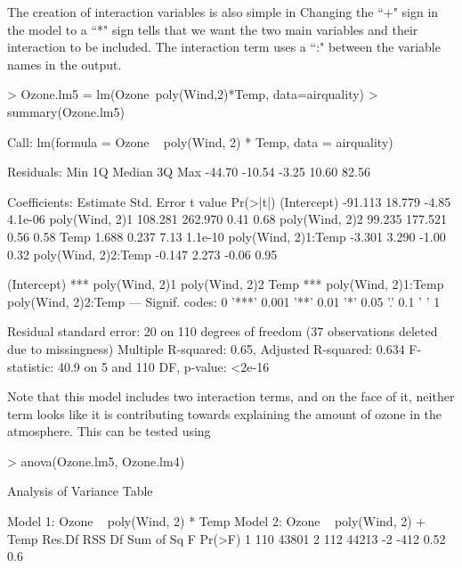 The creation of interaction variables is also simple in \R{} Changing the ``+" sign in the model to a ``*" sign tells \R{} that we want the two main variables and their interaction to be included. The interaction term uses a ``:" between the variable names in the output. 
\begin{Schunk}
\begin{Sinput}
> Ozone.lm5 = lm(Ozone~poly(Wind,2)*Temp, data=airquality) 
> summary(Ozone.lm5) 
\end{Sinput}
\begin{Soutput}

Call:
lm(formula = Ozone ~ poly(Wind, 2) * Temp, data = airquality)

Residuals:
   Min     1Q Median     3Q    Max 
-44.70 -10.54  -3.25  10.60  82.56 

Coefficients:
                    Estimate Std. Error t value Pr(>|t|)
(Intercept)          -91.113     18.779   -4.85  4.1e-06
poly(Wind, 2)1       108.281    262.970    0.41     0.68
poly(Wind, 2)2        99.235    177.521    0.56     0.58
Temp                   1.688      0.237    7.13  1.1e-10
poly(Wind, 2)1:Temp   -3.301      3.290   -1.00     0.32
poly(Wind, 2)2:Temp   -0.147      2.273   -0.06     0.95
                       
(Intercept)         ***
poly(Wind, 2)1         
poly(Wind, 2)2         
Temp                ***
poly(Wind, 2)1:Temp    
poly(Wind, 2)2:Temp    
---
Signif. codes:  
0 '***' 0.001 '**' 0.01 '*' 0.05 '.' 0.1 ' ' 1

Residual standard error: 20 on 110 degrees of freedom
  (37 observations deleted due to missingness)
Multiple R-squared:  0.65,	Adjusted R-squared:  0.634 
F-statistic: 40.9 on 5 and 110 DF,  p-value: <2e-16
\end{Soutput}
\end{Schunk}
Note that this model includes two interaction terms, and on the face of it, neither term looks like it is contributing towards explaining the amount of ozone in the atmosphere. This can be tested using 
\begin{Schunk}
\begin{Sinput}
> anova(Ozone.lm5, Ozone.lm4) 
\end{Sinput}
\begin{Soutput}
Analysis of Variance Table

Model 1: Ozone ~ poly(Wind, 2) * Temp
Model 2: Ozone ~ poly(Wind, 2) + Temp
  Res.Df   RSS Df Sum of Sq    F Pr(>F)
1    110 43801                         
2    112 44213 -2      -412 0.52    0.6
\end{Soutput}
\end{Schunk}
 

